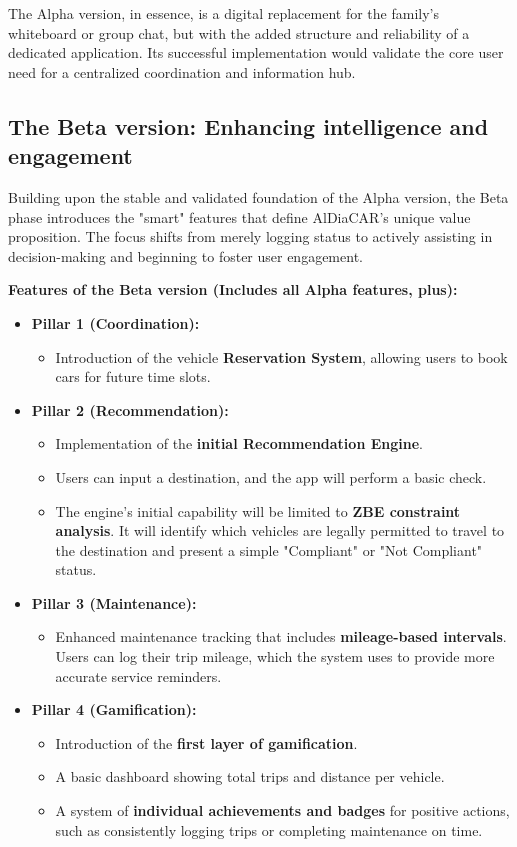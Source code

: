 The Alpha version, in essence, is a digital replacement for the family's whiteboard or group chat, but with the added structure and reliability of a dedicated application. Its successful implementation would validate the core user need for a centralized coordination and information hub.

\subsection{The Beta version: Enhancing intelligence and engagement}

Building upon the stable and validated foundation of the Alpha version, the Beta phase introduces the "smart" features that define AlDiaCAR's unique value proposition. The focus shifts from merely logging status to actively assisting in decision-making and beginning to foster user engagement.

\textgap

\textbf{Features of the Beta version (Includes all Alpha features, plus):}
\begin{itemize}
    \item \textbf{Pillar 1 (Coordination):}
    \begin{itemize}
        \item Introduction of the vehicle \textbf{Reservation System}, allowing users to book cars for future time slots.
    \end{itemize}
    \item \textbf{Pillar 2 (Recommendation):}
    \begin{itemize}
        \item Implementation of the \textbf{initial Recommendation Engine}.
        \item Users can input a destination, and the app will perform a basic check.
        \item The engine's initial capability will be limited to \textbf{ZBE constraint analysis}. It will identify which vehicles are legally permitted to travel to the destination and present a simple "Compliant" or "Not Compliant" status.
    \end{itemize}
    \item \textbf{Pillar 3 (Maintenance):}
    \begin{itemize}
        \item Enhanced maintenance tracking that includes \textbf{mileage-based intervals}. Users can log their trip mileage, which the system uses to provide more accurate service reminders.
    \end{itemize}
    \item \textbf{Pillar 4 (Gamification):}
    \begin{itemize}
        \item Introduction of the \textbf{first layer of gamification}.
        \item A basic dashboard showing total trips and distance per vehicle.
        \item A system of \textbf{individual achievements and badges} for positive actions, such as consistently logging trips or completing maintenance on time.
    \end{itemize}
\end{itemize}

